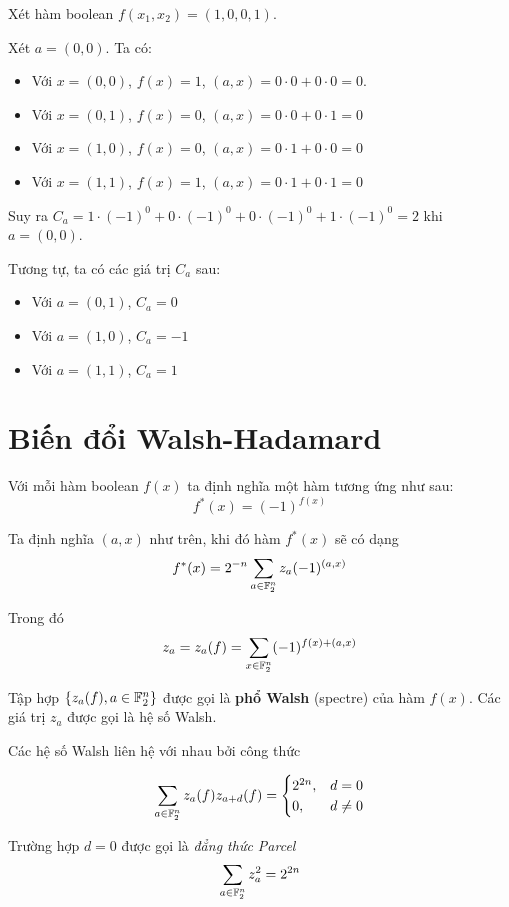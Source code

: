 \begin{example}
    Xét hàm boolean $f(x_1, x_2) = (1, 0, 0, 1)$.

    Xét $a = (0, 0)$. Ta có:
    \begin{itemize}
        \item Với $x = (0, 0)$, $f(x) = 1$, $(a, x) =
        0 \cdot 0 + 0 \cdot 0 = 0$.
        \item Với $x = (0, 1)$, $f(x) = 0$, $(a, x) = 
        0 \cdot 0 + 0 \cdot 1 = 0$
        \item Với $x = (1, 0)$, $f(x) = 0$, $(a, x) = 
        0 \cdot 1 + 0 \cdot 0 = 0$
        \item Với $x = (1, 1)$, $f(x) = 1$, $(a, x) = 
        0 \cdot 1 + 0 \cdot 1 = 0$
    \end{itemize}
    Suy ra $C_a = 1 \cdot (-1)^0 + 0 \cdot (-1)^0 + 0 \cdot (-1)^0
        + 1 \cdot (-1)^0 = 2$ khi $a = (0, 0)$.

    Tương tự, ta có các giá trị $C_a$ sau:
    \begin{itemize}
        \item Với $a = (0, 1)$, $C_a = 0$
        \item Với $a = (1, 0)$, $C_a = -1$
        \item Với $a = (1, 1)$, $C_a = 1$
    \end{itemize}
\end{example}

\section{Biến đổi Walsh-Hadamard}

Với mỗi hàm boolean $f(x)$ ta định nghĩa một hàm tương ứng như sau:
\[f^*(x) = (-1)^{f(x)}\]

Ta định nghĩa $(a, x)$ như trên, khi đó hàm $f^*(x)$ sẽ có dạng
\begin{equation}
    f^*(x) = 2^{-n} \sum_{a \in \mathbb{F}_2^n} z_a (-1)^{(a, x)}
\end{equation}

Trong đó
\begin{equation}
    z_a = z_a (f) = \sum_{x \in \mathbb{F}_2^n} (-1)^{f(x) + (a, x)}
\end{equation}

Tập hợp $\{z_a(f), a \in \mathbb{F}_2^n\}$ được gọi là \textbf{phổ
Walsh} (spectre) của hàm $f(x)$. Các giá trị $z_a$ được gọi là hệ số
Walsh.

Các hệ số Walsh liên hệ với nhau bởi công thức

\begin{equation}
    \sum_{a \in \mathbb{F}_2^n} z_a(f) z_{a+d}(f) = 
    \begin{cases}
    2^{2n}, & d = 0 \\
    0, & d \neq 0
    \end{cases}
\end{equation}

Trường hợp $d = 0$ được gọi là \textit{đẳng thức Parcel}
\begin{equation}
    \sum_{a \in \mathbb{F}_2^n} z_a^2 = 2^{2n}
\end{equation}